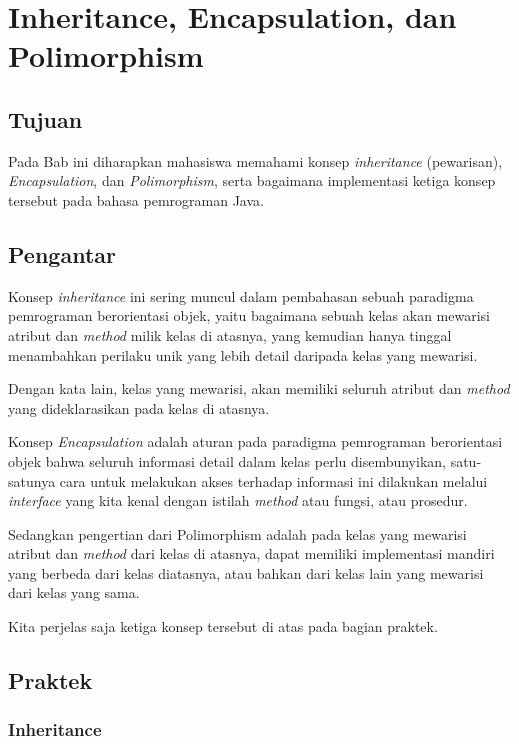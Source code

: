 \chapter{Inheritance, Encapsulation, dan Polimorphism}

\section{Tujuan}

Pada Bab ini diharapkan mahasiswa memahami konsep \textit{inheritance} (pewarisan), \textit{Encapsulation}, dan \textit{Polimorphism}, serta bagaimana implementasi ketiga konsep tersebut pada bahasa pemrograman Java.

\section{Pengantar}

Konsep \textit{inheritance} ini sering muncul dalam pembahasan sebuah paradigma pemrograman berorientasi objek, yaitu bagaimana sebuah kelas akan mewarisi atribut dan \textit{method} milik kelas di atasnya, yang kemudian hanya tinggal menambahkan perilaku unik yang lebih detail daripada kelas yang mewarisi.

Dengan kata lain, kelas yang mewarisi, akan memiliki seluruh atribut dan \textit{method} yang dideklarasikan pada kelas di atasnya.

Konsep \textit{Encapsulation} adalah aturan pada paradigma pemrograman berorientasi objek bahwa seluruh informasi detail dalam kelas perlu disembunyikan, satu-satunya cara untuk melakukan akses terhadap informasi ini dilakukan melalui \textit{interface} yang kita kenal dengan istilah \textit{method} atau fungsi, atau prosedur.

Sedangkan pengertian dari Polimorphism adalah pada kelas yang mewarisi atribut dan \textit{method} dari kelas di atasnya, dapat memiliki implementasi mandiri yang berbeda dari kelas diatasnya, atau bahkan dari kelas lain yang mewarisi dari kelas yang sama.

Kita perjelas saja ketiga konsep tersebut di atas pada bagian praktek.

\section{Praktek}

\subsection{Inheritance}

